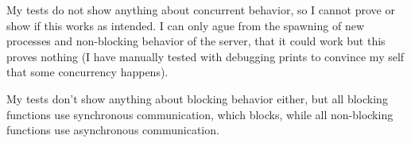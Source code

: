 \documentclass[a4paper, 10pt]{article}
\begin{document}
My tests do not show anything about concurrent behavior, so I cannot prove or show if this works as intended. I can only ague from the spawning of new processes and non-blocking behavior of the server, that it could work but this proves nothing (I have manually tested with debugging prints to convince my self that some concurrency happens).

My tests don't show anything about blocking behavior either, but all blocking functions use synchronous communication, which blocks, while all non-blocking functions use asynchronous communication.

\newpage

\end{document}
